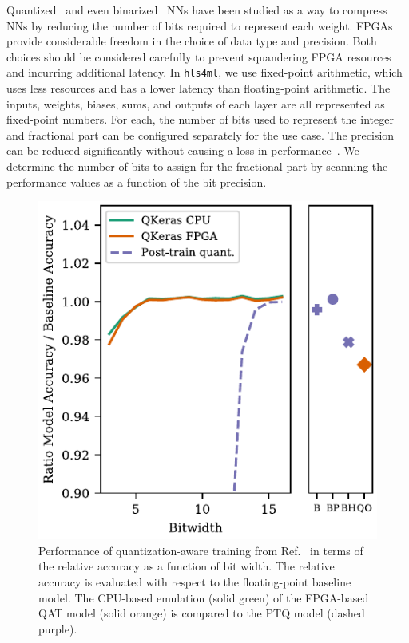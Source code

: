 \documentclass[sigconf]{acmart}
\newcommand{\hlsfml}{\texttt{hls4ml}\xspace}
\renewcommand{\vec}[1]{\boldsymbol{#1}}
\begin{document}
Quantized~\cite{DBLP:journals/corr/GongLYB14,wu2016quantized,37631,DBLP:journals/corr/GuptaAGN15,DBLP:journals/corr/HanMD15,JMLR:v18:16-456} and even binarized~\cite{NIPS2015_5647,NIPS2016_6573,DBLP:journals/corr/RastegariORF16,DBLP:journals/corr/MerollaAAEM16,DBLP:journals/corr/GuptaAGN15,DiGuglielmo:2020eqx} NNs have been studied as a way to compress NNs by reducing the number of bits required to represent each weight.
FPGAs provide considerable freedom in the choice of data type and precision.  
Both choices should be considered carefully to prevent squandering FPGA resources and incurring additional latency.  
In \hlsfml, we use fixed-point arithmetic, which uses less resources and has a lower latency than floating-point arithmetic.  
The inputs, weights, biases, sums, and outputs of each layer are all represented as fixed-point numbers. 
For each, the number of bits used to represent the integer and fractional part can be configured separately for the use case.  
The precision can be reduced significantly without causing a loss in performance~\cite{DBLP:journals/corr/GuptaAGN15}.
We determine the number of bits to assign for the fractional part by scanning the performance values as a function of the bit precision.

\begin{figure}[t!]
\centering
\includegraphics[width=0.6\columnwidth]{Figs/accuracy-2.pdf}
\caption{Performance of quantization-aware training from Ref.~\cite{Coelho:2020zfu} in terms of the relative accuracy as a function of bit width. 
The relative accuracy is evaluated with respect to the floating-point baseline model.
The CPU-based emulation (solid green) of the FPGA-based QAT model (solid orange) is compared to the PTQ model (dashed purple). }
\label{fig:qat}
\end{figure}
\end{document}
